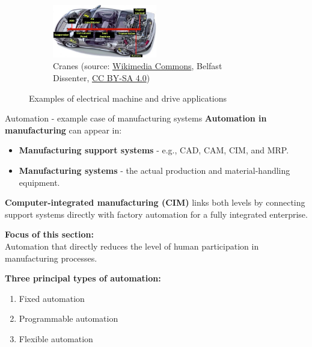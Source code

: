 \begin{frame}
\begin{figure}
\begin{subfigure}[b]{0.49\textwidth}
		\end{subfigure}
		\hfill
		\begin{subfigure}[b]{0.49\textwidth}
			\centering
			\includegraphics[width=0.5\textwidth]{fig/lec01/CAN.jpg}
			\caption{Cranes (source: \href{https://commons.wikimedia.org/wiki/File:Hammelmann_Stationary_unit_with_electric_motor.jpg}{Wikimedia Commons}, Belfast Dissenter, \href{https://creativecommons.org/licenses/by-sa/4.0/deed.en}{CC BY-SA 4.0})}
		\end{subfigure}
		\caption*{Examples of electrical machine and drive applications} 
        \label{fig:examples_machine_drives_02}
	\end{figure}
\end{frame}


\begin{frame}{Automation - example case of manufacturing systems}
\textbf{Automation in manufacturing} can appear in:
\begin{itemize}
  \item \textbf{Manufacturing support systems} - e.g., CAD, CAM, CIM, and MRP.
  \item \textbf{Manufacturing systems} - the actual production and material-handling equipment.
\end{itemize}

\textbf{Computer-integrated manufacturing (CIM)} links both levels by connecting support systems directly with factory automation for a fully integrated enterprise.

\vspace{3mm}
\textbf{Focus of this section:}\\
Automation that directly reduces the level of human participation in manufacturing processes.

\vspace{3mm}
\textbf{Three principal types of automation:}
\begin{enumerate}
  \item Fixed automation
  \item Programmable automation
  \item Flexible automation
\end{enumerate}
\end{frame}

